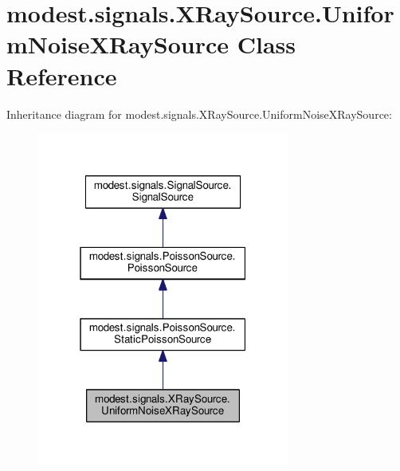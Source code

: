 \hypertarget{classmodest_1_1signals_1_1XRaySource_1_1UniformNoiseXRaySource}{}\section{modest.\+signals.\+X\+Ray\+Source.\+Uniform\+Noise\+X\+Ray\+Source Class Reference}
\label{classmodest_1_1signals_1_1XRaySource_1_1UniformNoiseXRaySource}


Inheritance diagram for modest.\+signals.\+X\+Ray\+Source.\+Uniform\+Noise\+X\+Ray\+Source\+:\nopagebreak
\begin{figure}[H]
\begin{center}
\leavevmode
\includegraphics[width=235pt]{classmodest_1_1signals_1_1XRaySource_1_1UniformNoiseXRaySource__inherit__graph}
\end{center}
\end{figure}


